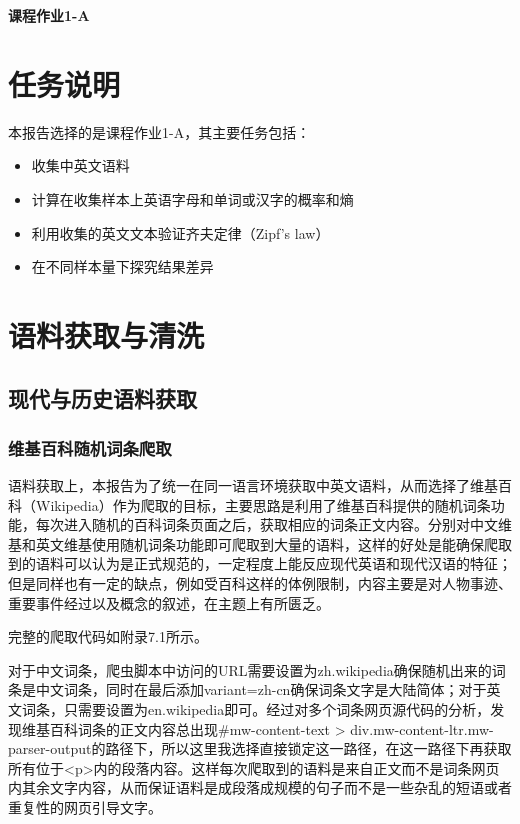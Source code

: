 \documentclass[11pt]{article}
\begin{document}
	\pagestyle{fancy}
	\chead{}
	
	\begin{center}
		{\LARGE \bf 课程作业1-A} 
	\end{center}
	\begin{center}
		\large{}
	\end{center}
	
	\section{任务说明}
	本报告选择的是课程作业1-A，其主要任务包括：
	\begin{itemize}
		\item 收集中英文语料
		\item 计算在收集样本上英语字母和单词或汉字的概率和熵
		\item 利用收集的英文文本验证齐夫定律（Zipf’s law）
		\item 在不同样本量下探究结果差异
	\end{itemize}
	
	\section{语料获取与清洗}
	\subsection{现代与历史语料获取}
	\subsubsection{维基百科随机词条爬取}
	语料获取上，本报告为了统一在同一语言环境获取中英文语料，从而选择了维基百科（Wikipedia）作为爬取的目标，主要思路是利用了维基百科提供的随机词条功能，每次进入随机的百科词条页面之后，获取相应的词条正文内容。分别对中文维基和英文维基使用随机词条功能即可爬取到大量的语料，这样的好处是能确保爬取到的语料可以认为是正式规范的，一定程度上能反应现代英语和现代汉语的特征；但是同样也有一定的缺点，例如受百科这样的体例限制，内容主要是对人物事迹、重要事件经过以及概念的叙述，在主题上有所匮乏。
	
	完整的爬取代码如附录7.1所示。
	
	对于中文词条，爬虫脚本中访问的URL需要设置为zh.wikipedia确保随机出来的词条是中文词条，同时在最后添加variant=zh-cn确保词条文字是大陆简体；对于英文词条，只需要设置为en.wikipedia即可。经过对多个词条网页源代码的分析，发现维基百科词条的正文内容总出现\#mw-content-text > div.mw-content-ltr.mw-parser-output的路径下，所以这里我选择直接锁定这一路径，在这一路径下再获取所有位于<p>内的段落内容。这样每次爬取到的语料是来自正文而不是词条网页内其余文字内容，从而保证语料是成段落成规模的句子而不是一些杂乱的短语或者重复性的网页引导文字。
	
\end{document}
